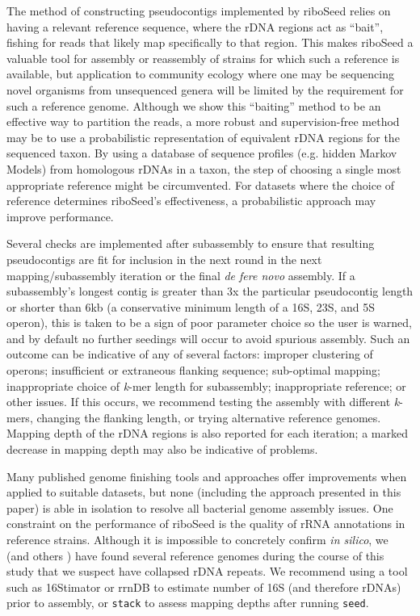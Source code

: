 \documentclass[a4,center,fleqn]{NAR}
\begin{document}
The method of constructing pseudocontigs implemented by riboSeed relies on having a relevant reference sequence, where the rDNA regions act as ``bait'', fishing for reads that likely map specifically to that region. This makes riboSeed a valuable tool for assembly or reassembly of strains for which such a reference is available, but application to community ecology where one may be sequencing novel organisms from unsequenced genera will be limited by the requirement for such a reference genome.  Although we show this ``baiting'' method to be an effective way to partition the reads, a more robust and supervision-free method may be to use a probabilistic representation of equivalent rDNA regions for the sequenced taxon. By using a database of sequence profiles (e.g. hidden Markov Models) from homologous rDNAs in a taxon, the step of choosing a single most appropriate reference might be circumvented. For datasets where the choice of reference determines riboSeed's effectiveness, a probabilistic approach may improve performance.

Several checks are implemented after subassembly to ensure that resulting pseudocontigs are fit for inclusion in the next round in the next mapping/subassembly iteration or the final \textit{de fere novo} assembly. If a subassembly's longest contig is greater than 3x the particular pseudocontig length or shorter than 6kb (a conservative minimum length of a 16S, 23S, and 5S operon), this is taken to be a sign of poor parameter choice so the user is warned, and by default no further seedings will occur to avoid spurious assembly. Such an outcome can be indicative of any of several factors: improper clustering of operons; insufficient or extraneous flanking sequence; sub-optimal mapping; inappropriate choice of \textit{k}-mer length for subassembly; inappropriate reference; or other issues. If this occurs, we recommend testing the assembly with different \textit{k}-mers, changing the flanking length, or trying alternative reference genomes. Mapping depth of the rDNA regions is also reported for each iteration; a marked decrease in mapping depth may also be indicative of problems.

Many published genome finishing tools and approaches offer improvements when applied to suitable datasets, but none (including the approach presented in this paper) is able in isolation to resolve all bacterial genome assembly issues. One constraint on the performance of riboSeed is the quality of rRNA annotations in reference strains. Although it is impossible to concretely confirm \textit{in silico}, we (and others \cite{Mariano2016}) have found several reference genomes during the course of this study that we suspect have collapsed rDNA repeats. We recommend using a tool such as 16Stimator \cite{Perisin2016} or rrnDB \cite{Stoddard2014} to estimate number of 16S (and therefore rDNAs) prior to assembly, or \texttt{stack} to assess mapping depths after running \texttt{seed}.
\end{document}
